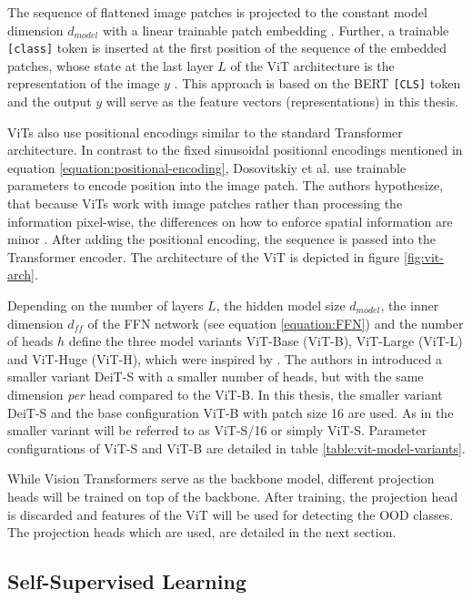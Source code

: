 The sequence of flattened image patches is projected to the constant model dimension $d_{model}$ with a linear trainable patch embedding \citep{Dosovitskiy2020,Vaswani2017}.
Further, a trainable \texttt{[class]} token is inserted at the first position of the sequence of the embedded patches, whose state at the last layer $L$ of the ViT architecture is the representation of the image $y$ \citep{Dosovitskiy2020}.
This approach is based on the BERT \texttt{[CLS]} token \citep{Devlin2018} and the output $y$ will serve as the feature vectors (representations) in this thesis.
\par
ViTs also use positional encodings similar to the standard Transformer architecture.
In contrast to the fixed sinusoidal positional encodings mentioned in equation \ref{equation:positional-encoding}, Dosovitskiy et al. \citep{Dosovitskiy2020} use trainable parameters to encode position into the image patch.
The authors hypothesize, that because ViTs work with image patches rather than processing the information pixel-wise, the differences on how to enforce spatial information are minor \citep{Dosovitskiy2020}.
After adding the positional encoding, the sequence is passed into the Transformer encoder.
The architecture of the ViT is depicted in figure \ref{fig:vit-arch}.
\par
Depending on the number of layers $L$, the hidden model size $d_{model}$, the inner dimension $d_{ff}$ of the FFN network (see equation \ref{equation:FFN}) and the number of heads $h$ \citep{Dosovitskiy2020} define the three model variants ViT-Base (ViT-B), ViT-Large (ViT-L) and ViT-Huge (ViT-H), which were inspired by \citep{Devlin2018}.
The authors in \citep{Touvron2020} introduced a smaller variant DeiT-S with a smaller number of heads, but with the same dimension \textit{per} head compared to the ViT-B.
In this thesis, the smaller variant DeiT-S \citep{Touvron2020} and the base configuration ViT-B with patch size 16 are used.
As in \citep{Caron2021} the smaller variant will be referred to as ViT-S/16 or simply ViT-S.
Parameter configurations of ViT-S and ViT-B are detailed in table \ref{table:vit-model-variants}.
\par
While Vision Transformers serve as the backbone model, different projection heads will be trained on top of the backbone. 
After training, the projection head is discarded and features of the ViT will be used for detecting the OOD classes.
The projection heads which are used, are detailed in the next section.
\subsection{Self-Supervised Learning}
